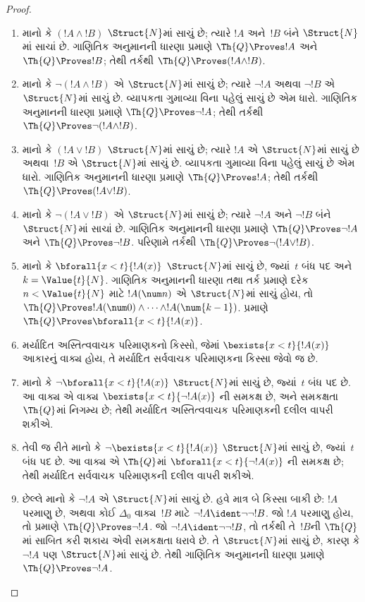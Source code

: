 \begin{proof}
\begin{enumerate}
\item માનો કે $(!A \land !B)$
$\Struct{N}$માં સાચું છે;
ત્યારે $!A$ અને~$!B$ બંને
$\Struct{N}$માં સાચાં છે.
ગાણિતિક અનુમાનની ધારણા પ્રમાણે
$\Th{Q} \Proves !A$ અને
$\Th{Q} \Proves !B$;
તેથી તર્કથી
$\Th{Q} \Proves (!A \land !B)$.
\item માનો કે
$\lnot (!A \land !B)$ એ
$\Struct{N}$માં સાચું છે;
ત્યારે $\lnot !A$ અથવા
$\lnot !B$ એ $\Struct{N}$માં
સાચું છે. વ્યાપકતા ગુમાવ્યા
વિના પહેલું સાચું છે એમ
ધારો. ગાણિતિક અનુમાનની ધારણા પ્રમાણે
$\Th{Q} \Proves \lnot !A$;
તેથી તર્કથી $\Th{Q} \Proves
\lnot (!A \land !B)$.
\item માનો કે $(!A \lor !B)$
$\Struct{N}$માં સાચું છે;
ત્યારે $!A$ એ $\Struct{N}$માં
સાચું છે અથવા~$!B$ એ
$\Struct{N}$માં સાચું છે.
વ્યાપકતા ગુમાવ્યા વિના પહેલું
સાચું છે એમ ધારો.
ગાણિતિક અનુમાનની ધારણા પ્રમાણે
$\Th{Q} \Proves !A$;
તેથી તર્કથી $\Th{Q} \Proves
(!A \lor !B)$.
\item માનો કે
$\lnot(!A \lor !B)$ એ
$\Struct{N}$માં સાચું છે;
ત્યારે $\lnot !A$ અને
$\lnot !B$ બંને $\Struct{N}$માં
સાચાં છે. ગાણિતિક અનુમાનની ધારણા
પ્રમાણે $\Th{Q} \Proves
\lnot !A$ અને
$\Th{Q} \Proves \lnot !B$.
પરિણામે તર્કથી
$\Th{Q} \Proves
\lnot(!A \lor !B)$.
\item માનો કે
$\bforall{x<t}{!A(x)}$
$\Struct{N}$માં સાચું છે,
જ્યાં~$t$ બંધ પદ અને
$k=\Value{t}{N}$. ગાણિતિક અનુમાનની
ધારણા તથા તર્ક પ્રમાણે
દરેક $n < \Value{t}{N}$
માટે $!A(\num n)$ એ
$\Struct{N}$માં સાચું હોય,
તો $\Th{Q} \Proves
!A(\num 0) \land \dots \land !A(\num{k-1})$.
પ્રમાણે $\Th{Q} \Proves
\bforall{x<t}{!A(x)}$.
\item મર્યાદિત અસ્તિત્વવાચક
પરિમાણકનો કિસ્સો, જેમાં
$\bexists{x < t}{!A(x)}$
આકારનું વાક્ય હોય,
તે મર્યાદિત સર્વવાચક
પરિમાણકના કિસ્સા જેવો જ છે.
\item માનો કે
$\lnot \bforall{x<t}{!A(x)}$
$\Struct{N}$માં સાચું છે,
જ્યાં~$t$ બંધ પદ છે.
આ વાક્ય એ
વાક્ય
$\bexists{x<t}{\lnot !A(x)}$
ની સમકક્ષ છે, અને સમકક્ષતા
$\Th{Q}$માં નિગમ્ય છે;
તેથી મર્યાદિત અસ્તિત્વવાચક
પરિમાણકની દલીલ વાપરી શકીએ.
\item તેવી જ રીતે માનો કે
$\lnot \bexists{x<t}{!A(x)}$
$\Struct{N}$માં સાચું છે,
જ્યાં~$t$ બંધ પદ છે.
આ વાક્ય એ
$\Th{Q}$માં
$\bforall{x<t}{\lnot!A(x)}$
ની સમકક્ષ છે; તેથી
મર્યાદિત સર્વવાચક પરિમાણકની
દલીલ વાપરી શકીએ.
\item છેલ્લે માનો કે
$\lnot !A$ એ $\Struct{N}$માં
સાચું છે. હવે માત્ર બે
કિસ્સા બાકી છે: $!A$
પરમાણુ છે, અથવા કોઈ
$\Delta_0$ વાક્ય~$!B$
માટે
$\lnot !A \ident \lnot\lnot !B$.
જો $!A$ પરમાણુ હોય, તો
પ્રમાણે $\Th{Q} \Proves
\lnot !A$. જો
$\lnot !A \ident \lnot\lnot !B$,
તો તર્કથી તે~$!B$ની
$\Th{Q}$માં સાબિત કરી શકાય
એવી સમકક્ષતા ધરાવે છે.
તે $\Struct{N}$માં સાચું છે,
કારણ કે $\lnot !A$ પણ
$\Struct{N}$માં સાચું છે.
તેથી ગાણિતિક અનુમાનની ધારણા પ્રમાણે
$\Th{Q} \Proves \lnot !A$.
\end{enumerate}
\end{proof}

